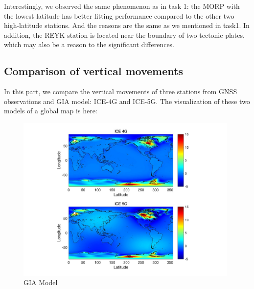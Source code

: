 \documentclass{article}
\begin{document}
Interestingly, we observed the same phenomenon as in task 1: 
the MORP with the lowest latitude has better fitting performance compared to the other two high-latitude stations.
And the reasons are the same as we mentioned in task1. 
In addition, the REYK station is located near the boundary of two tectonic plates, 
which may also be a reason to the significant differences.

\subsection{Comparison of vertical movements}
In this part, we compare the vertical movements of three stations from GNSS observations and GIA model: ICE-4G and ICE-5G.
The visualization of these two models of a global map is here:
\begin{figure}[H]
  \centering
  \includegraphics[width=11cm]{../result/re_figure/fig_kiru/1.jpg}
  \captionsetup{skip=0.2cm}
  \caption{GIA Model}
  \label{fig:GIA_global}
\end{figure}
\end{document}
